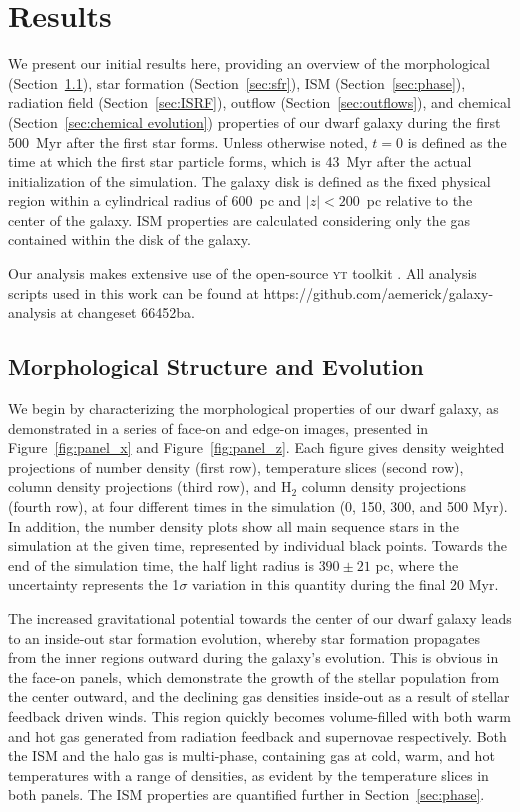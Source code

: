 \documentclass[twocolumn]{aastex61}
\begin{document}
\section{Results}
\label{sec:results}
We present our initial results here, providing an overview of the morphological (Section~\ref{sec:structure}), star formation (Section~\ref{sec:sfr}), ISM (Section~\ref{sec:phase}), radiation field (Section~\ref{sec:ISRF}), outflow (Section~\ref{sec:outflows}), and chemical (Section~\ref{sec:chemical evolution}) properties of our dwarf galaxy during the first 500~Myr after the first star forms. Unless otherwise noted, $t = 0$ is defined as the time at which the first star particle forms, which is 43~Myr after the actual initialization of the simulation. The galaxy disk is defined as the fixed physical region within a cylindrical radius of 600~pc and $|z| < 200$~pc relative to the center of the galaxy. ISM properties are calculated considering only the gas contained within the disk of the galaxy.

Our analysis makes extensive use of the open-source \textsc{yt} toolkit \citep{yt}. All analysis scripts used in this work can be found at https://github.com/aemerick/galaxy-analysis at changeset 66452ba.

\subsection{Morphological Structure and Evolution}
\label{sec:structure}

We begin by characterizing the morphological properties of our dwarf galaxy, as demonstrated in a series of face-on and edge-on images, presented in Figure~\ref{fig:panel_x} and Figure~\ref{fig:panel_z}. Each figure gives density weighted projections of number density (first row), temperature slices (second row),  column density projections (third row), and H$_2$ column density projections (fourth row), at four different times in the simulation (0, 150, 300, and 500 Myr). In addition, the number density plots show all main sequence stars in the simulation at the given time, represented by individual black points. Towards the end of the simulation time, the half light radius is $390 \pm 21$ pc, where the uncertainty represents the 1$\sigma$ variation in this quantity during the final 20 Myr.

The increased gravitational potential towards the center of our dwarf galaxy leads to an inside-out star formation evolution, whereby star formation propagates from the inner regions outward during the galaxy's evolution. This is obvious in the face-on panels, which demonstrate the growth of the stellar population from the center outward, and the declining gas densities inside-out as a result of stellar feedback driven winds. This region quickly becomes volume-filled with both warm and hot gas generated from radiation feedback and supernovae respectively. Both the ISM and the halo gas is multi-phase, containing gas at cold, warm, and hot temperatures with a range of densities, as evident by the temperature slices in both panels. The ISM properties are quantified further in Section~\ref{sec:phase}.
\end{document}
